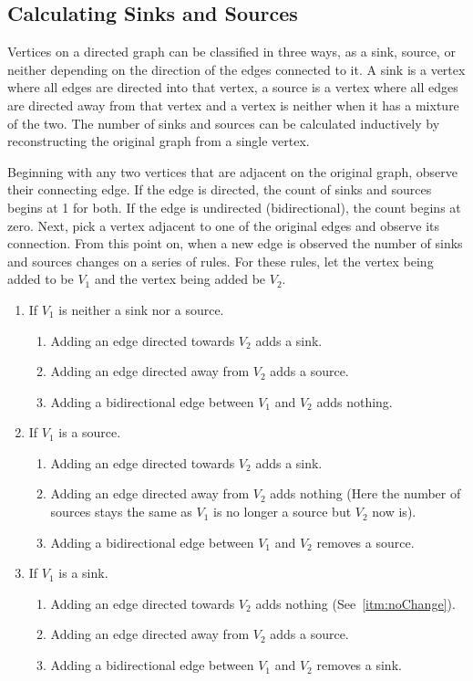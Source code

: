 \documentclass[11pt,reqno]{amsart}
\theoremstyle{definition}
\theoremstyle{plain}
\begin{document}
	\subsection{Calculating Sinks and Sources}
		Vertices on a directed graph can be classified in three ways, as a sink, source, or neither depending on the direction
		of the edges connected to it.  A sink is a vertex where all edges are directed into that vertex, a source is a vertex where
		all edges are directed away from that vertex and a vertex is neither when it has a mixture of the two.  The number of sinks
		and sources can be calculated inductively by reconstructing the original graph from a single vertex.

		Beginning with any two vertices that are adjacent on the original graph, observe their connecting edge.
		If the edge is directed, the count of sinks and sources begins at 1 for both.  If the edge
		is undirected (bidirectional), the count begins at zero. Next, pick a vertex adjacent to one of the original
		edges and observe its connection.  From this point on, when a new edge is observed the number of sinks and
		sources changes on a series of rules.  For these rules, let the vertex being added to be $V_1$ and
		the vertex being added be $V_2$.
		\begin{enumerate}
			\item If $V_1$ is neither a sink nor a source.
			\begin{enumerate}
				\item Adding an edge directed towards $V_2$ adds a sink.
				\item Adding an edge directed away from $V_2$ adds a source.
				\item Adding a bidirectional edge between $V_1$ and $V_2$ adds nothing.
			\end{enumerate}
			\item If $V_1$ is a source.
			\begin{enumerate}
				\item Adding an edge directed towards $V_2$ adds a sink.
				\item Adding an edge directed away from $V_2$ adds nothing (Here the number of sources stays \label{itm:noChange}
					the same as $V_1$ is no longer a source but $V_2$ now is).
				\item Adding a bidirectional edge between $V_1$ and $V_2$ removes a source.
			\end{enumerate}
			\item If $V_1$ is a sink.
			\begin{enumerate}
				\item Adding an edge directed towards $V_2$ adds nothing (See~\ref{itm:noChange}).
				\item Adding an edge directed away from $V_2$ adds a source.
				\item Adding a bidirectional edge between $V_1$ and $V_2$ removes a sink.
			\end{enumerate}
		\end{enumerate}
\end{document}

